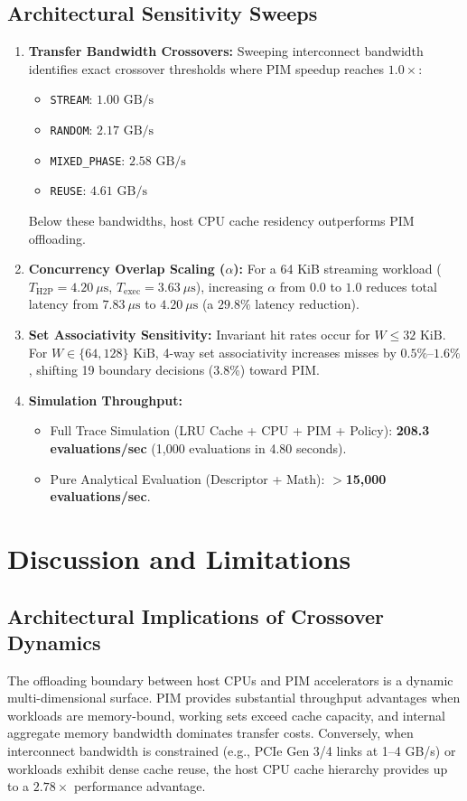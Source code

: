 \documentclass[journal,10pt,twocolumn]{IEEEtran}
\begin{document}
\subsection{Architectural Sensitivity Sweeps}
\begin{enumerate}
    \item \textbf{Transfer Bandwidth Crossovers:} Sweeping interconnect bandwidth identifies exact crossover thresholds where PIM speedup reaches $1.0\times$:
    \begin{itemize}
        \item \texttt{STREAM}: $1.00\text{ GB/s}$
        \item \texttt{RANDOM}: $2.17\text{ GB/s}$
        \item \texttt{MIXED\_PHASE}: $2.58\text{ GB/s}$
        \item \texttt{REUSE}: $4.61\text{ GB/s}$
    \end{itemize}
    Below these bandwidths, host CPU cache residency outperforms PIM offloading.
    \item \textbf{Concurrency Overlap Scaling ($\alpha$):} For a 64 KiB streaming workload ($T_{\text{H2P}} = 4.20\ \mu\text{s}$, $T_{\text{exec}} = 3.63\ \mu\text{s}$), increasing $\alpha$ from $0.0$ to $1.0$ reduces total latency from $7.83\ \mu\text{s}$ to $4.20\ \mu\text{s}$ (a $29.8\%$ latency reduction).
    \item \textbf{Set Associativity Sensitivity:} Invariant hit rates occur for $W \le 32\text{ KiB}$. For $W \in \{64, 128\}\text{ KiB}$, 4-way set associativity increases misses by $0.5\%$--$1.6\%$, shifting 19 boundary decisions (3.8\%) toward PIM.
    \item \textbf{Simulation Throughput:}
    \begin{itemize}
        \item Full Trace Simulation (LRU Cache + CPU + PIM + Policy): \textbf{208.3 evaluations/sec} (1,000 evaluations in 4.80 seconds).
        \item Pure Analytical Evaluation (Descriptor + Math): \textbf{$>$15,000 evaluations/sec}.
    \end{itemize}
\end{enumerate}

\section{Discussion and Limitations}
\subsection{Architectural Implications of Crossover Dynamics}
The offloading boundary between host CPUs and PIM accelerators is a dynamic multi-dimensional surface. PIM provides substantial throughput advantages when workloads are memory-bound, working sets exceed cache capacity, and internal aggregate memory bandwidth dominates transfer costs. Conversely, when interconnect bandwidth is constrained (e.g., PCIe Gen 3/4 links at 1--4 GB/s) or workloads exhibit dense cache reuse, the host CPU cache hierarchy provides up to a $2.78\times$ performance advantage.
\end{document}
